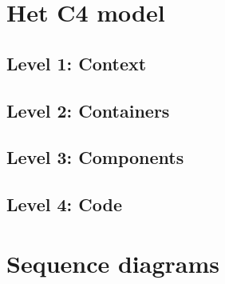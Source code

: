 
\section{Het C4 model}

\subsection{Level 1: Context}
\subsection{Level 2: Containers}
\subsection{Level 3: Components}
\subsection{Level 4: Code}

\section{Sequence diagrams}